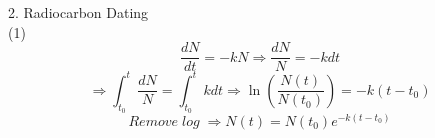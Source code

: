 \documentclass [24pt] {report}
\begin{document}
	2. Radiocarbon Dating\\
	(1)
	\[\frac{dN}{dt} = -kN \Rightarrow \frac{dN}{N} = -k dt\]
	\[\Rightarrow \int_{t_{0}}^{t}\frac{dN}{N} = \int_{t_0}^{t} k dt \Rightarrow \ln(\frac{N(t)}{N(t_0)}) = -k(t-t_0)\]
	\[Remove\; log\; \Rightarrow N(t) = N(t_0)e^{-k(t-t_0)}\]
\end{document}
